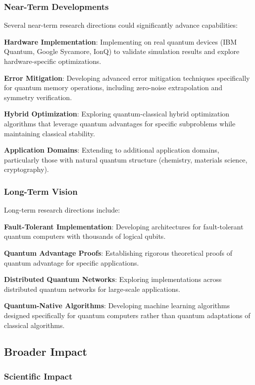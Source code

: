 \subsubsection{Near-Term Developments}

Several near-term research directions could significantly advance \qmnn capabilities:

\textbf{Hardware Implementation}: Implementing \qmnn on real quantum devices (IBM Quantum, Google Sycamore, IonQ) to validate simulation results and explore hardware-specific optimizations.

\textbf{Error Mitigation}: Developing advanced error mitigation techniques specifically for quantum memory operations, including zero-noise extrapolation and symmetry verification.

\textbf{Hybrid Optimization}: Exploring quantum-classical hybrid optimization algorithms that leverage quantum advantages for specific subproblems while maintaining classical stability.

\textbf{Application Domains}: Extending \qmnn to additional application domains, particularly those with natural quantum structure (chemistry, materials science, cryptography).

\subsubsection{Long-Term Vision}

Long-term research directions include:

\textbf{Fault-Tolerant Implementation}: Developing \qmnn architectures for fault-tolerant quantum computers with thousands of logical qubits.

\textbf{Quantum Advantage Proofs}: Establishing rigorous theoretical proofs of quantum advantage for specific \qmnn applications.

\textbf{Distributed Quantum Networks}: Exploring \qmnn implementations across distributed quantum networks for large-scale applications.

\textbf{Quantum-Native Algorithms}: Developing machine learning algorithms designed specifically for quantum computers rather than quantum adaptations of classical algorithms.

\subsection{Broader Impact}

\subsubsection{Scientific Impact}

